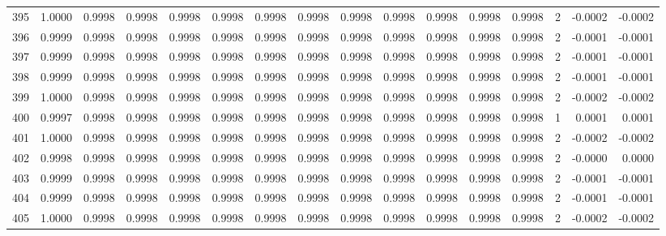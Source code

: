 \begin{tabular}{lrrrrrrrrrrrrrrr}
395 &      1.0000 &  0.9998 &  0.9998 &  0.9998 &  0.9998 &  0.9998 &  0.9998 &  0.9998 &  0.9998 &  0.9998 &   0.9998 &     0.9998 &      2 &                   -0.0002 &                    -0.0002 \\
396 &      0.9999 &  0.9998 &  0.9998 &  0.9998 &  0.9998 &  0.9998 &  0.9998 &  0.9998 &  0.9998 &  0.9998 &   0.9998 &     0.9998 &      2 &                   -0.0001 &                    -0.0001 \\
397 &      0.9999 &  0.9998 &  0.9998 &  0.9998 &  0.9998 &  0.9998 &  0.9998 &  0.9998 &  0.9998 &  0.9998 &   0.9998 &     0.9998 &      2 &                   -0.0001 &                    -0.0001 \\
398 &      0.9999 &  0.9998 &  0.9998 &  0.9998 &  0.9998 &  0.9998 &  0.9998 &  0.9998 &  0.9998 &  0.9998 &   0.9998 &     0.9998 &      2 &                   -0.0001 &                    -0.0001 \\
399 &      1.0000 &  0.9998 &  0.9998 &  0.9998 &  0.9998 &  0.9998 &  0.9998 &  0.9998 &  0.9998 &  0.9998 &   0.9998 &     0.9998 &      2 &                   -0.0002 &                    -0.0002 \\
400 &      0.9997 &  0.9998 &  0.9998 &  0.9998 &  0.9998 &  0.9998 &  0.9998 &  0.9998 &  0.9998 &  0.9998 &   0.9998 &     0.9998 &      1 &                    0.0001 &                     0.0001 \\
401 &      1.0000 &  0.9998 &  0.9998 &  0.9998 &  0.9998 &  0.9998 &  0.9998 &  0.9998 &  0.9998 &  0.9998 &   0.9998 &     0.9998 &      2 &                   -0.0002 &                    -0.0002 \\
402 &      0.9998 &  0.9998 &  0.9998 &  0.9998 &  0.9998 &  0.9998 &  0.9998 &  0.9998 &  0.9998 &  0.9998 &   0.9998 &     0.9998 &      2 &                   -0.0000 &                     0.0000 \\
403 &      0.9999 &  0.9998 &  0.9998 &  0.9998 &  0.9998 &  0.9998 &  0.9998 &  0.9998 &  0.9998 &  0.9998 &   0.9998 &     0.9998 &      2 &                   -0.0001 &                    -0.0001 \\
404 &      0.9999 &  0.9998 &  0.9998 &  0.9998 &  0.9998 &  0.9998 &  0.9998 &  0.9998 &  0.9998 &  0.9998 &   0.9998 &     0.9998 &      2 &                   -0.0001 &                    -0.0001 \\
405 &      1.0000 &  0.9998 &  0.9998 &  0.9998 &  0.9998 &  0.9998 &  0.9998 &  0.9998 &  0.9998 &  0.9998 &   0.9998 &     0.9998 &      2 &                   -0.0002 &                    -0.0002 \\

\end{tabular}
